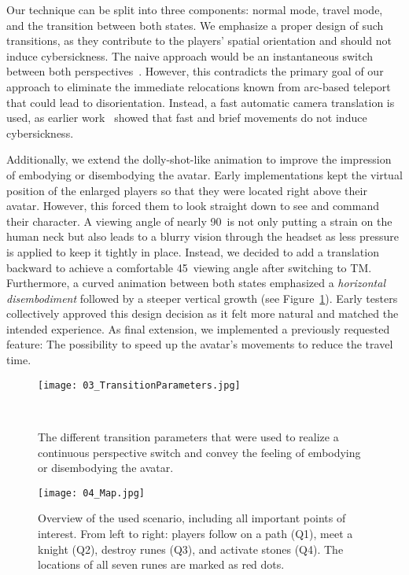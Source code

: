 \documentclass{sigchi}
\newcommand{\comm}[1]{}
\begin{document}
Our technique can be split into three components: normal mode, travel mode, and the transition between both states. We emphasize a proper design of such transitions, as they contribute to the players' spatial orientation and should not induce cybersickness. The naive approach would be an instantaneous switch between both perspectives~\cite{Habgood:2017:HLP:3130859.3131437}.\comm{ to avoid cybersickness through translating the virtual camera} However, this contradicts the primary goal of our approach to eliminate the immediate relocations known from arc-based teleport that could lead to disorientation. Instead, a fast automatic camera translation\comm{movement between both perspectives} is used\comm{ to convey a proper transition}, as earlier work~\cite{krekhov2018gullivr, Habgood:2017:HLP:3130859.3131437} showed that fast and brief movements do not induce cybersickness.\par

Additionally, we extend the dolly-shot-like animation to improve the impression of embodying or disembodying the avatar. Early implementations kept the virtual position of the enlarged players so that they were located right above their avatar. However, this forced them to look straight down to see and command their character. A viewing angle of nearly 90\textdegree~is not only putting a strain on the human neck but also leads to a blurry vision through the headset as less pressure is applied to keep it tightly in place. Instead, we decided to add a translation backward to achieve a comfortable 45\textdegree~viewing angle after switching to TM. Furthermore, a curved animation between both states emphasized a \textit{horizontal disembodiment} followed by a steeper vertical growth (see Figure~\ref{fig:transitionParameters}). Early testers collectively approved this design decision as it felt more natural and matched the intended experience. As final extension, we implemented a previously requested feature: The possibility to speed up the avatar's movements to reduce the travel time.\par
\begin{figure}
\centering
\texttt{[image: 03\_TransitionParameters.jpg]}
\caption{The different transition parameters that were used to realize a continuous perspective switch and convey the feeling of embodying or disembodying the avatar.}~\label{fig:transitionParameters}
\end{figure}
\begin{figure*}[t!]
\centering
\texttt{[image: 04\_Map.jpg]}
\caption{Overview of the used scenario, including all important points of interest. From left to right: players follow on a path (Q1), meet a knight (Q2), destroy runes (Q3), and activate stones (Q4). The locations of all seven runes are marked as red dots.}
\label{fig:map}
\end{figure*}
\end{document}
